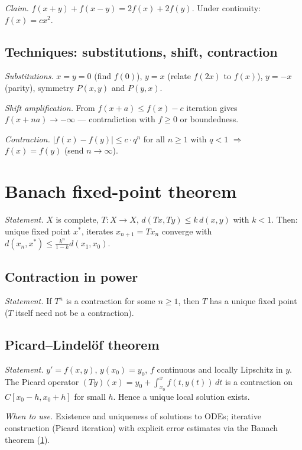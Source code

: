 \textit{Claim.} $f(x+y)+f(x-y)=2f(x)+2f(y)$. Under continuity: $f(x)=cx^2$.

\medskip

\subsection{Techniques: substitutions, shift, contraction}
\label{subsec:functional-tech}

\textit{Substitutions.} $x=y=0$ (find $f(0)$), $y=x$ (relate $f(2x)$ to $f(x)$), $y=-x$ (parity), symmetry $P(x,y)$ and $P(y,x)$.

\textit{Shift amplification.} From $f(x+a)\leq f(x)-c$ iteration gives $f(x+na)\to-\infty$ --- contradiction with $f\geq0$ or boundedness.

\textit{Contraction.} $|f(x)-f(y)|\le c\cdot q^n$ for all $n\ge1$ with $q<1$ $\Rightarrow$ $f(x)=f(y)$ (send $n\to\infty$).

\medskip

\section{Banach fixed-point theorem}
\label{sec:banach}

\textit{Statement.} $X$ is complete, $T:X\to X$, $d(Tx,Ty)\leq k\,d(x,y)$ with $k<1$. Then: unique fixed point $x^*$, iterates $x_{n+1}=Tx_n$ converge with $d(x_n,x^*)\leq\frac{k^n}{1-k}d(x_1,x_0)$.

\subsection{Contraction in power}
\label{subsec:contraction-power}

\textit{Statement.} If $T^n$ is a contraction for some $n\ge1$, then $T$ has a unique fixed point ($T$ itself need not be a contraction).

\medskip

\subsection{Picard--Lindel\"of theorem}
\label{subsec:picard}

\textit{Statement.} $y' = f(x,y)$, $y(x_0)=y_0$, $f$ continuous and locally Lipschitz in $y$. The Picard operator $(Ty)(x) = y_0 + \int_{x_0}^x f(t,y(t))\,dt$ is a contraction on $C[x_0-h,x_0+h]$ for small $h$. Hence a unique local solution exists.

\textit{When to use.} Existence and uniqueness of solutions to ODEs; iterative construction (Picard iteration) with explicit error estimates via the Banach theorem (\ref{sec:banach}).

